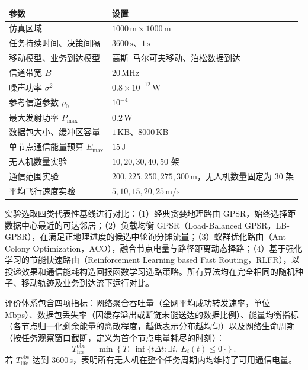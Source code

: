 \begin{table}[!htbp]
\centering\small
{}
\label{rq1:tab:settings}
\begin{tabularx}{\textwidth}{lX}
\toprule
参数 & 设置 \\
\midrule
仿真区域 & $1000\,\mathrm{m}\times1000\,\mathrm{m}$ \\
任务持续时间、决策间隔 & $3600\,\mathrm{s}$、$1\,\mathrm{s}$ \\
移动模型、业务到达模型 & 高斯--马尔可夫移动、泊松数据到达 \\
信道带宽 $B$ & $20\,\mathrm{MHz}$ \\
噪声功率 $\sigma^2$ & $0.8\times10^{-12}\,\mathrm{W}$ \\
参考信道参数 $\rho_0$ & $10^{-4}$ \\
最大发射功率 $P_{\max}$ & $0.2\,\mathrm{W}$ \\
数据包大小、缓冲区容量 & $1\,\mathrm{KB}$、$8000\,\mathrm{KB}$ \\
单节点通信能量预算 $E_{\max}$ & $15\,\mathrm{J}$ \\
无人机数量实验 & $10,20,30,40,50$ 架 \\
通信范围实验 & $200,225,250,275,300\,\mathrm{m}$，无人机数量固定为 30 架 \\
平均飞行速度实验 & $5,10,15,20,25\,\mathrm{m/s}$ \\
\bottomrule
\end{tabularx}
\end{table}

实验选取四类代表性基线进行对比：（1）经典贪婪地理路由 GPSR\cite{gpsr}，始终选择距数据中心最近的可达邻居；（2）负载均衡 GPSR（Load-Balanced GPSR，LB-GPSR），在满足正地理进度的候选中轮询分摊流量；（3）蚁群优化路由（Ant Colony Optimization，ACO）\cite{aco}，融合节点电量与路径距离动态择路；（4）基于强化学习的节能快速路由（Reinforcement Learning based Fast Routing，RLFR）\cite{drlfr}，以投递效果和通信能耗构造回报函数学习选路策略。所有算法均在完全相同的随机种子、移动轨迹及业务到达流下运行对比。

评价体系包含四项指标：网络聚合吞吐量（全网平均成功转发速率，单位 Mbps）、数据包丢失率（因缓存溢出或断链未能送达的数据比例）、能量均衡指标（各节点归一化剩余能量的离散程度，越低表示分布越均匀）以及网络生命周期（按任务观察窗口截断，定义为首个节点电量耗尽的时刻）：
\begin{equation}
 T_{\mathrm{life}}^{\mathrm{obs}}=
 \min\!\left\{T,\ \inf\{t\Delta t:\exists i,\ E_i(t)\le0\}\right\}.
 \label{rq1:eq:observed_lifetime}
\end{equation}
若 $T_{\mathrm{life}}^{\mathrm{obs}}$ 达到 $3600\,\mathrm{s}$，表明所有无人机在整个任务周期内均维持了可用通信电量。

